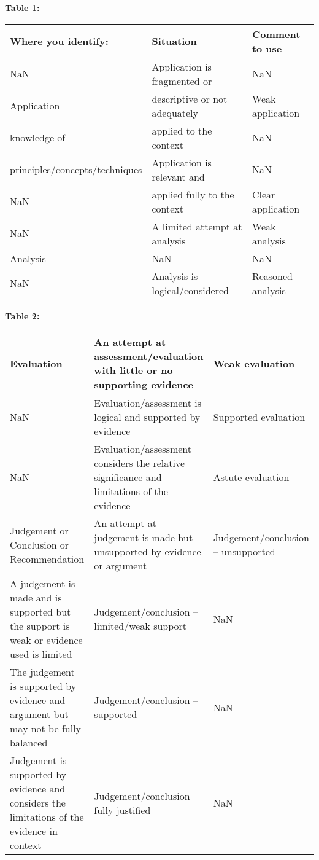 \documentclass{article}
\begin{document}
    \textbf{Table 1:}
\begin{tabular}{lll}
\toprule
Where you identify: & Situation & Comment to use \\
\midrule
NaN & Application is fragmented or & NaN \\
Application & descriptive or not adequately & Weak application \\
knowledge of & applied to the context & NaN \\
principles/concepts/techniques & Application is relevant and & NaN \\
NaN & applied fully to the context & Clear application \\
NaN & A limited attempt at analysis & Weak analysis \\
Analysis & NaN & NaN \\
NaN & Analysis is logical/considered & Reasoned analysis \\
\bottomrule
\end{tabular}

\textbf{Table 2:}
\begin{tabular}{lll}
\toprule
Evaluation & An attempt at
assessment/evaluation with
little or no supporting
evidence & Weak evaluation \\
\midrule
NaN & Evaluation/assessment is
logical and supported by
evidence & Supported evaluation \\
NaN & Evaluation/assessment
considers the relative
significance and limitations of
the evidence & Astute evaluation \\
Judgement or Conclusion or
Recommendation & An attempt at judgement is
made but unsupported by
evidence or argument & Judgement/conclusion –
unsupported \\
A judgement is made and is
supported but the support is
weak or evidence used is
limited & Judgement/conclusion –
limited/weak support & NaN \\
The judgement is supported
by evidence and argument
but may not be fully balanced & Judgement/conclusion –
supported & NaN \\
Judgement is supported by
evidence and considers the
limitations of the evidence in
context & Judgement/conclusion –
fully justified & NaN \\
\bottomrule
\end{tabular}
\end{document}
